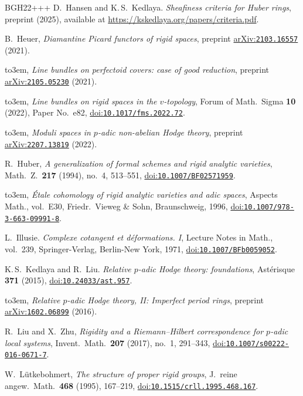 \documentclass[10pt,a4paper]{article}
\newcommand{\doi}[1]{\href{https://doi.org/#1}{doi:\nolinkurl{#1}}}
\newcommand{\arXiv}[1]{\href{https://arxiv.org/abs/#1}{arXiv:\nolinkurl{#1}}}
\providecommand{\bysame}{\leavevmode\hbox to3em{\hrulefill}\thinspace}
\theoremstyle{definition}
\theoremstyle{remark}
\numberwithin{equation}{section}
\begin{document}
\begin{thebibliography}{BGH{\etalchar{+}}22+++}
D.~Hansen and  K.\,S.~Kedlaya.
{\em Sheafiness criteria for {H}uber rings}, preprint (2025), available at \url{https://kskedlaya.org/papers/criteria.pdf}.

B.~Heuer, 
{\em {D}iamantine {P}icard functors of rigid spaces}, preprint \arXiv{2103.16557} (2021).
	
\bysame, 
{\em Line bundles on perfectoid covers: case of good reduction}, preprint \arXiv{2105.05230} (2021).
	
\bysame, 
{\em Line bundles on rigid spaces in the $v$-topology}, Forum of Math.\ Sigma \textbf{10} (2022), Paper No.~e82, \doi{10.1017/fms.2022.72}.
	
\bysame, 
{\em Moduli spaces in $p$-adic non-abelian {H}odge theory}, preprint \arXiv{2207.13819} (2022).
	
R.~Huber, 
{\em {A} generalization of formal schemes and rigid analytic varieties}, Math.~Z.\ \textbf{217} (1994), no.~4, 513--551, \doi{10.1007/BF02571959}.
	
\bysame, 
{\em \'{E}tale cohomology of rigid analytic varieties and adic spaces}, Aspects Math., vol.~E30, Friedr.\ Vieweg \& Sohn, Braunschweig, 1996, \doi{10.1007/978-3-663-09991-8}.
	
L.~Illusie.
{\em Complexe cotangent et d\'{e}formations. {I}}, Lecture Notes in Math., vol.~239, Springer-Verlag, Berlin-New York, 1971, \doi{10.1007/BFb0059052}.
	
K.\,S.~Kedlaya and  R.~Liu.
{\em {R}elative {$p$}-adic {H}odge theory: foundations}, Ast\'{e}risque \textbf{371} (2015), \doi{10.24033/ast.957}.

\bysame, 
{\em {R}elative $p$-adic {H}odge theory, {I}{I}: {I}mperfect period rings}, preprint \arXiv{1602.06899} (2016).

R.~Liu and  X.~Zhu, 
{\em Rigidity and a {R}iemann--{H}ilbert correspondence for {$p$}-adic local systems}, Invent.\ Math.\ \textbf{207} (2017), no.~1, 291--343, \doi{10.1007/s00222-016-0671-7}.

W.~L{\"{u}}tkebohmert, 
{\em The structure of proper rigid groups}, J.~reine angew.\ Math.\ \textbf{468} (1995), 167--219, \doi{10.1515/crll.1995.468.167}.


\end{thebibliography}
\end{document}
